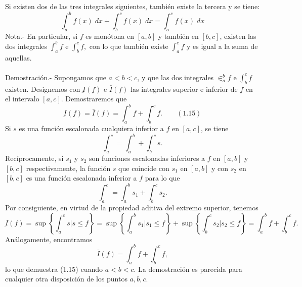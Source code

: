 \begin{teo} Si existen dos de las tres integrales siguientes, también existe la tercera y se tiene: $$\int_a^b f(x) \; dx + \int_b^c f(x) \; dx = \int_a^c f(x) \; dx$$
    Nota.- \; En particular, si $f$ es monótona en $[a,b]$ y también en $[b,c]$, existen las dos integrales $\int_a^b f$ e $\int_b^c f,$ con lo que también existe $\int_a^c f$ y es igual a la suma de aquellas.\\\\
    Demostración.-\; Supongamos que $a<b<c$, y que las dos integrales $\in_a^b f$ e $\int_b^c f$ existen. Designemos con $\underbar{I}(f)$ e $\bar{I}(f)$ las integrales superior e inferior de $f$ en el intervalo $[a,c]$. Demostraremos que $$\underbar{I}(f) = \bar{I}(f) = \int_a^b f + \int_b^c f. \qquad (1.15)$$
    Si $s$ es una función escalonada cualquiera inferior a $f$ en $[a,c]$, se tiene $$\int_a^c = \int_a^b + \int_b^c s.$$
    Recíprocamente, si $s_1$ y $s_2$ son funciones escalonadas inferiores a $f$ en $[a,b]$ y $[b,c]$ respectivamente, la función $s$ que coincide con $s_1$ en $[a,b]$ y con $s_2$ en $[b,c]$ es una función escalonada inferior a $f$ para lo que $$\int_a^c = \int_a^b s_1 + \int_b^c s_2.$$
    Por consiguiente, en virtud de la propiedad aditiva del extremo superior, tenemos 
    $$\underbar{I}(f) = \sup\left\{\int_a^c s | s\leq f\right\} = \sup \left\{\int_a^b s_1 | s_1 \leq f\right\} + \sup \left\{\int_b^c s_2 | s_2 \leq f\right\} = \int_a^b f + \int_b^c f.$$
    Análogamente, encontramos $$\bar{I}(f) = \int_a^b f + \int_b^c f,$$
    lo que demuestra (1.15) cuando $a<b<c$. La demostración es parecida para cualquier otra disposición de los puntos $a,b,c$.\\\\

\end{teo}

